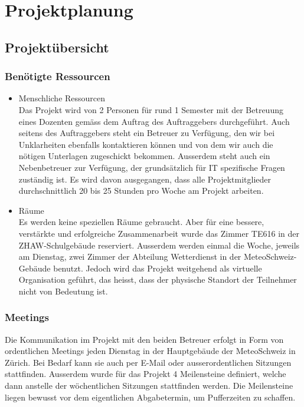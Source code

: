 \documentclass[a4paper,10pt]{article}
\begin{document}
\section{Projektplanung}

\subsection{Projektübersicht}

\subsubsection{Benötigte Ressourcen}
\begin{itemize}
\item Menschliche Ressourcen \\
Das Projekt wird von 2 Personen für rund 1 Semester mit der Betreuung
eines Dozenten gemäss dem Auftrag des Auftraggebers durchgeführt. Auch
seitens des Auftraggebers steht ein Betreuer zu Verfügung, den wir bei
Unklarheiten ebenfalls kontaktieren können und von dem wir auch die
nötigen Unterlagen zugeschickt bekommen. Ausserdem steht auch ein
Nebenbetreuer zur Verfügung, der grundsätzlich für IT spezifische Fragen
zuständig ist. Es wird davon ausgegangen, dass alle Projektmitglieder
durchschnittlich 20 bis 25 Stunden pro Woche am Projekt arbeiten.

\item Räume \\
Es werden keine speziellen Räume gebraucht. Aber für eine bessere,
verstärkte und erfolgreiche Zusammenarbeit wurde das Zimmer TE616 in der
ZHAW-Schulgebäude reserviert. Ausserdem werden einmal die Woche, jeweils
am Dienstag, zwei Zimmer der Abteilung Wetterdienst in der
MeteoSchweiz-Gebäude benutzt. Jedoch wird das Projekt weitgehend als
virtuelle Organisation geführt, das heisst, dass der physische Standort
der Teilnehmer nicht von Bedeutung ist.

\end{itemize}

\subsubsection{Meetings}
Die Kommunikation im Projekt mit den beiden Betreuer erfolgt in Form von ordentlichen Meetings jeden Dienstag in der Hauptgebäude der MeteoSchweiz in Zürich. Bei Bedarf kann sie auch per E-Mail oder ausserordentlichen Sitzungen stattfinden. Ausserdem wurde für das Projekt 4 Meilensteine definiert, welche dann anstelle der wöchentlichen Sitzungen stattfinden werden. Die Meilensteine liegen bewusst vor dem eigentlichen Abgabetermin, um Pufferzeiten zu schaffen.
\end{document}
